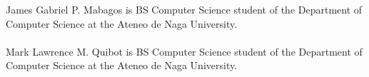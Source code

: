 \begin{vita}


James Gabriel P. Mabagos is BS Computer Science student of the Department of Computer Science at the Ateneo de Naga University.
\\
\\
Mark Lawrence M. Quibot is BS Computer Science student of the Department of Computer Science at the Ateneo de Naga University.


\end{vita}